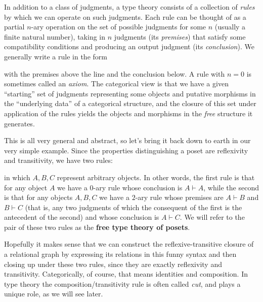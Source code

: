 \documentclass{book}
\let\types\vdash
\begin{document}
In addition to a class of judgments, a type theory consists of a collection of \emph{rules} by which we can operate on such judgments.
Each rule can be thought of as a partial $n$-ary operation on the set of possible judgments for some $n$ (usually a finite natural number), taking in $n$ judgments (its \emph{premises}) that satisfy some compatibility conditions and producing an output judgment (its \emph{conclusion}).
We generally write a rule in the form
\begin{mathpar}
\end{mathpar}
with the premises above the line and the conclusion below.
A rule with $n=0$ is sometimes called an \emph{axiom}.
The categorical view is that we have a given ``starting'' set of judgments representing some objects and putative morphisms in the ``underlying data'' of a categorical structure, and the closure of this set under application of the rules yields the objects and morphisms in the \emph{free} structure it generates.

This is all very general and abstract, so let's bring it back down to earth in our very simple example.
Since the properties distinguishing a poset are reflexivity and transitivity, we have two rules:
in which $A,B,C$ represent arbitrary objects.
In other words, the first rule is that for any object $A$ we have a $0$-ary rule whose conclusion is $A\types A$, while the second is that for any objects $A,B,C$ we have a $2$-ary rule whose premises are $A\types B$ and $B\types C$ (that is, any two judgments of which the consequent of the first is the antecedent of the second) and whose conclusion is $A\types C$.
We will refer to the pair of these two rules as the \textbf{free type theory of posets}.

Hopefully it makes sense that we can construct the reflexive-transitive closure of a relational graph by expressing its relations in this funny syntax and then closing up under these two rules, since they are exactly reflexivity and transitivity.
Categorically, of course, that means identities and composition.
In type theory the composition/transitivity rule is often called \emph{cut}, and plays a unique role, as we will see later.
\end{document}
